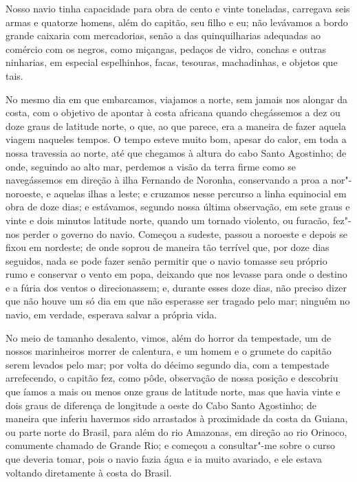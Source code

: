 Nosso navio tinha capacidade para obra de cento e vinte toneladas,
carregava seis armas e quatorze homens, além do capitão, seu filho e eu;
não levávamos a bordo grande caixaria com mercadorias, senão a das
quinquilharias adequadas ao comércio com os negros, como miçangas,
pedaços de vidro, conchas e outras ninharias, em especial espelhinhos,
facas, tesouras, machadinhas, e objetos que tais.

No mesmo dia em que embarcamos, viajamos a norte, sem jamais nos alongar
da costa, com o objetivo de apontar à costa africana quando chegássemos
a dez ou doze graus de latitude norte, o que, ao que parece, era a
maneira de fazer aquela viagem naqueles tempos. O tempo esteve muito
bom, apesar do calor, em toda a nossa travessia ao norte, até que
chegamos à altura do cabo Santo Agostinho; de onde, seguindo ao alto
mar, perdemos a visão da terra firme como se navegássemos em direção à
ilha Fernando de Noronha, conservando a proa a nor"-noroeste, e aquelas
ilhas a leste; e cruzamos nesse percurso a linha equinocial em obra de
doze dias; e estávamos, segundo nossa última observação, em sete graus e
vinte e dois minutos latitude norte, quando um tornado violento, ou
furacão, fez"-nos perder o governo do navio. Começou a sudeste, passou a
noroeste e depois se fixou em nordeste; de onde soprou de maneira tão
terrível que, por doze dias seguidos, nada se pode fazer senão permitir
que o navio tomasse seu próprio rumo e conservar o vento em popa,
deixando que nos levasse para onde o destino e a fúria dos ventos o
direcionassem; e, durante esses doze dias, não preciso dizer que não
houve um só dia em que não esperasse ser tragado pelo mar; ninguém no
navio, em verdade, esperava salvar a própria vida.

No meio de tamanho desalento, vimos, além do horror da tempestade, um de
nossos marinheiros morrer de calentura, e um homem e o grumete do
capitão serem levados pelo mar; por volta do décimo segundo dia, com a
tempestade arrefecendo, o capitão fez, como pôde, observação de nossa
posição e descobriu que íamos a mais ou menos onze graus de latitude
norte, mas que havia vinte e dois graus de diferença de longitude a
oeste do Cabo Santo Agostinho; de maneira que inferiu havermos sido
arrastados à proximidade da costa da Guiana, ou parte norte do Brasil,
para além do rio Amazonas, em direção ao rio Orinoco, comumente chamado
de Grande Rio; e começou a consultar"-me sobre o curso que deveria tomar,
pois o navio fazia água e ia muito avariado, e ele estava voltando
diretamente à costa do Brasil.

